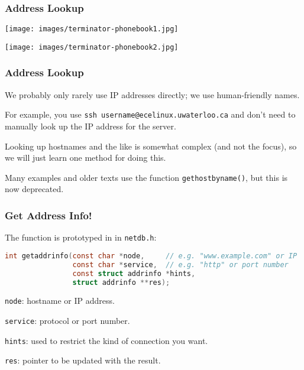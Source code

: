 \begin{frame}
	\frametitle{Address Lookup}

	\begin{center}
		\texttt{[image: images/terminator-phonebook1.jpg]}
	\end{center}
	\begin{center}
		\texttt{[image: images/terminator-phonebook2.jpg]}
	\end{center}


\end{frame}


\begin{frame}
	\frametitle{Address Lookup}

	We probably only rarely use IP addresses directly; we use human-friendly names.

	For example, you use \texttt{ssh username@ecelinux.uwaterloo.ca} and don't need to manually look up the IP address for the server.

	Looking up hostnames and the like is somewhat complex (and not the focus), so we will just learn one method for doing this.

	Many examples and older texts use the function \texttt{gethostbyname()}, but this is now deprecated.

\end{frame}


\begin{frame}[fragile]
	\frametitle{Get Address Info!}

	The function is prototyped in in \texttt{netdb.h}:

	\begin{lstlisting}[language=C]
int getaddrinfo(const char *node,     // e.g. "www.example.com" or IP
                const char *service,  // e.g. "http" or port number
                const struct addrinfo *hints,
                struct addrinfo **res);
\end{lstlisting}

	\texttt{node}: hostname or IP address.

	\texttt{service}: protocol or port number.

	\texttt{hints}: used to restrict the kind of connection you want.

	\texttt{res}: pointer to be updated with the result.

\end{frame}


